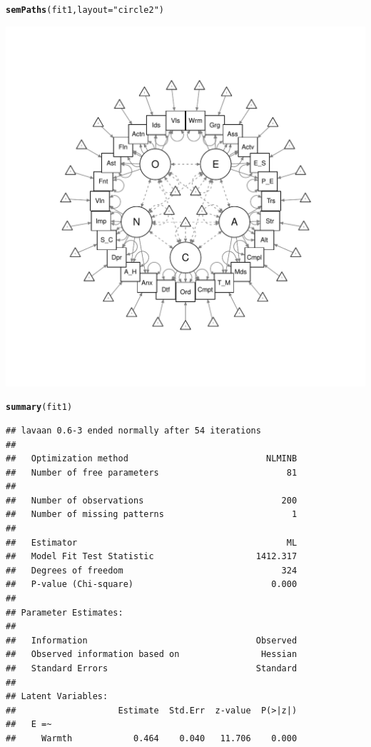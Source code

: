 \documentclass{article}\usepackage[]{graphicx}\usepackage[]{color}
\makeatletter
\def\maxwidth{ %
  \ifdim\Gin@nat@width>\linewidth
    \linewidth
  \else
    \Gin@nat@width
  \fi
}
\newcommand{\hlstr}[1]{\textcolor[rgb]{0.192,0.494,0.8}{#1}}%
\newcommand{\hlstd}[1]{\textcolor[rgb]{0.345,0.345,0.345}{#1}}%
\newcommand{\hlkwc}[1]{\textcolor[rgb]{0.333,0.667,0.333}{#1}}%
\newcommand{\hlkwd}[1]{\textcolor[rgb]{0.737,0.353,0.396}{\textbf{#1}}}%
\newenvironment{kframe}{%
 \def\at@end@of@kframe{}%
 \ifinner\ifhmode%
  \def\at@end@of@kframe{\end{minipage}}%
  \begin{minipage}{\columnwidth}%
 \fi\fi%
 \def\FrameCommand##1{\hskip\@totalleftmargin \hskip-\fboxsep
 \colorbox{shadecolor}{##1}\hskip-\fboxsep
     \hskip-\linewidth \hskip-\@totalleftmargin \hskip\columnwidth}%
 \MakeFramed {\advance\hsize-\width
   \@totalleftmargin\z@ \linewidth\hsize
   \@setminipage}}%
 {\par\unskip\endMakeFramed%
 \at@end@of@kframe}
\newenvironment{knitrout}{}{} %
\makeatother
\begin{document}
\begin{knitrout}
\begin{kframe}
\begin{alltt}
\hlkwd{semPaths}\hlstd{(fit1,} \hlkwc{layout} \hlstd{=} \hlstr{"circle2"}\hlstd{)}
\end{alltt}
\end{kframe}
\includegraphics[width=\maxwidth]{figure/unnamed-chunk-6-1} 
\begin{kframe}\begin{alltt}
\hlkwd{summary}\hlstd{(fit1)}
\end{alltt}
\begin{verbatim}
## lavaan 0.6-3 ended normally after 54 iterations
## 
##   Optimization method                           NLMINB
##   Number of free parameters                         81
## 
##   Number of observations                           200
##   Number of missing patterns                         1
## 
##   Estimator                                         ML
##   Model Fit Test Statistic                    1412.317
##   Degrees of freedom                               324
##   P-value (Chi-square)                           0.000
## 
## Parameter Estimates:
## 
##   Information                                 Observed
##   Observed information based on                Hessian
##   Standard Errors                             Standard
## 
## Latent Variables:
##                    Estimate  Std.Err  z-value  P(>|z|)
##   E =~                                                
##     Warmth            0.464    0.040   11.706    0.000

\end{verbatim}
\end{kframe}
\end{knitrout}
\end{document}
